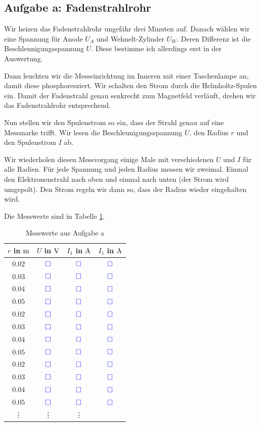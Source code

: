 \documentclass[11pt]{article}
\newcommand{\messwert}{\textcolor{blue}{\square}}
\begin{document}
\subsection{Aufgabe a: Fadenstrahlrohr}

\label{Durchführung-a}

Wir heizen das Fadenstrahlrohr ungefähr drei Minuten auf. Danach wählen wir
eine Spannung für Anode $U_A$ und Wehnelt-Zylinder $U_W$. Deren Differenz ist
die Beschleunigungsspannung $U$. Diese bestimme ich allerdings erst in der
Auswertung.

Dann leuchten wir die Messeinrichtung im Inneren mit einer Taschenlampe an,
damit diese phosphoresziert. Wir schalten den Strom durch die Helmholtz-Spulen
ein. Damit der Fadenstrahl genau senkrecht zum Magnetfeld verläuft, drehen wir
das Fadenstrahlrohr entsprechend.

Nun stellen wir den Spulenstrom so ein, dass der Strahl genau auf eine
Messmarke trifft. Wir lesen die Beschleunigungsspannung $U$, den Radius $r$ und
den Spulenstrom $I$ ab.

Wir wiederholen diesen Messvorgang einige Male mit verschiedenen $U$ und $I$
für alle Radien. Für jede Spannung und jeden Radius messen wir zweimal. Einmal
den Elektronenstrahl nach oben und einmal nach unten (der Strom wird umgepolt).
Den Strom regeln wir dann so, dass der Radius wieder eingehalten wird.

Die Messwerte sind in Tabelle \ref{table:Aufgabe-a}.

\begin{table}[H]
	\centering

	\begin{tabular}{cccc}
		$r$ in $\unit m$ & $U$ in $\unit V$ & $I_1$ in $\unit A$ & $I_1$ in $\unit A$ \\
		\hline
		$0.02$ & $\messwert$ & $\messwert$ & $\messwert$ \\
		$0.03$ & $\messwert$ & $\messwert$ & $\messwert$ \\
		$0.04$ & $\messwert$ & $\messwert$ & $\messwert$ \\
		$0.05$ & $\messwert$ & $\messwert$ & $\messwert$ \\
		\hline
		$0.02$ & $\messwert$ & $\messwert$ & $\messwert$ \\
		$0.03$ & $\messwert$ & $\messwert$ & $\messwert$ \\
		$0.04$ & $\messwert$ & $\messwert$ & $\messwert$ \\
		$0.05$ & $\messwert$ & $\messwert$ & $\messwert$ \\
		\hline
		$0.02$ & $\messwert$ & $\messwert$ & $\messwert$ \\
		$0.03$ & $\messwert$ & $\messwert$ & $\messwert$ \\
		$0.04$ & $\messwert$ & $\messwert$ & $\messwert$ \\
		$0.05$ & $\messwert$ & $\messwert$ & $\messwert$ \\
		\hline
		   \vdots & \vdots & \vdots
	\end{tabular}

	\caption{Messwerte aus Aufgabe a}
	\label{table:Aufgabe-a}
\end{table}
\end{document}
